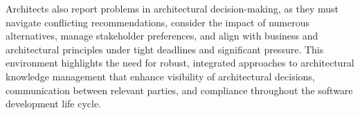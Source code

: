         Architects also report problems in architectural decision-making, as they must navigate conflicting recommendations, consider the impact of numerous alternatives, manage stakeholder preferences, and align with business and architectural principles under tight deadlines and significant pressure. \cite{archtitect_survey} This environment highlights the need for robust, integrated approaches to architectural knowledge management that enhance visibility of architectural decisions, communication between relevant parties, and compliance throughout the software development life cycle.

        
